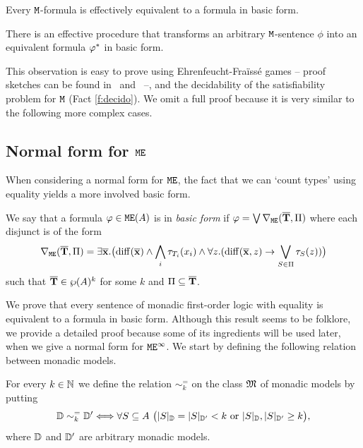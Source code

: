 \medskip

\noindent
Every $\mathtt{M}$-formula is effectively equivalent to a formula in basic form.

\begin{fact}\label{fact:ofonormalform}
There is an effective procedure that transforms an arbitrary $\mathtt{M}$-sentence 
$\phi$ into an equivalent formula $\varphi^{*}$ in basic form.
\end{fact}

This observation is easy to prove using Ehrenfeucht-Fra\"iss\'e games -- proof
sketches can be found in~\cite[Lemma 16.23]{ALG02} 
and~\cite[Proposition 4.14]{Venema2014} --, and the decidability of the satisfiability problem for $\mathtt{M}$ (Fact \ref{f:decido}). 
We omit a full proof because it is very similar to the following more complex 
cases.



\subsection{Normal form for $\mathtt{M}\mathtt{E}$}

When considering a normal form for $\mathtt{M}\mathtt{E}$, the fact that we can `count types'
using equality yields a more involved basic form.



\begin{definition}
We say that a formula $\varphi \in \mathtt{M}\mathtt{E}(A)$ is in \emph{basic form} if
$\varphi = \bigvee \nabla_{\mathtt{M}\mathtt{E}}(\overline{{\mathbf{T}}},\Pi)$ where each disjunct is of the
form
\begin{equation*}
\nabla_{\mathtt{M}\mathtt{E}}(\overline{{\mathbf{T}}},\Pi) = 
\exists \overline{{\mathbf{x}}}.\big(\mathrm{diff}(\overline{{\mathbf{x}}}) \land \bigwedge_i \tau_{T_i}(x_i) 
  \land \forall z.(\mathrm{diff}(\overline{{\mathbf{x}}},z) 
  \to \bigvee_{S\in \Pi} \tau_S(z))\big)
\end{equation*}
%
such that $\overline{{\mathbf{T}}} \in \wp(A)^k$ for some $k$ and $\Pi \subseteq \overline{{\mathbf{T}}}$.
\end{definition}

We prove that every sentence of monadic first-order logic with equality is
equivalent to a formula in basic form. 
Although this result seems to be folklore, we provide a detailed proof because 
some of its ingredients will be used later, when we give a normal form for 
$\mathtt{M}\mathtt{E}^{\infty}$. 
We start by defining the following relation between monadic models.

\begin{definition}
For every $k \in \mathbb{N}$ we define the relation $\sim^=_k$ on the class $\mathfrak{M}$
of monadic models by putting
\begin{eqnarray*}
\mathbb{D} \sim^=_k \mathbb{D}' \Longleftrightarrow 
  \forall S\subseteq A \ \big(
    |S|_{\mathbb{D}} = |S|_{\mathbb{D}'} < k \text{ or } 
    |S|_{\mathbb{D}},|S|_{\mathbb{D}'} \geq k 
    \big),
\end{eqnarray*}
where $\mathbb{D}$ and $\mathbb{D}'$ are arbitrary monadic models. 
\end{definition}

